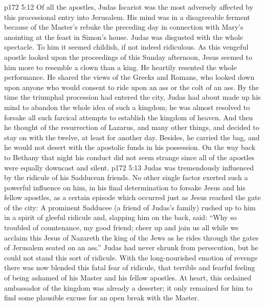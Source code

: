 \vs p172 5:12 Of all the apostles, Judas Iscariot was the most adversely affected by this processional entry into Jerusalem. His mind was in a disagreeable ferment because of the Master’s rebuke the preceding day in connection with Mary’s anointing at the feast in Simon’s house. Judas was disgusted with the whole spectacle. To him it seemed childish, if not indeed ridiculous. As this vengeful apostle looked upon the proceedings of this Sunday afternoon, Jesus seemed to him more to resemble a clown than a king. He heartily resented the whole performance. He shared the views of the Greeks and Romans, who looked down upon anyone who would consent to ride upon an ass or the colt of an ass. By the time the triumphal procession had entered the city, Judas had about made up his mind to abandon the whole idea of such a kingdom; he was almost resolved to forsake all such farcical attempts to establish the kingdom of heaven. And then he thought of the resurrection of Lazarus, and many other things, and decided to stay on with the twelve, at least for another day. Besides, he carried the bag, and he would not desert with the apostolic funds in his possession. On the way back to Bethany that night his conduct did not seem strange since all of the apostles were equally downcast and silent.
\vs p172 5:13 Judas was tremendously influenced by the ridicule of his Sadducean friends. No other single factor exerted such a powerful influence on him, in his final determination to forsake Jesus and his fellow apostles, as a certain episode which occurred just as Jesus reached the gate of the city: A prominent Sadducee (a friend of Judas’s family) rushed up to him in a spirit of gleeful ridicule and, slapping him on the back, said: “Why so troubled of countenance, my good friend; cheer up and join us all while we acclaim this Jesus of Nazareth the king of the Jews as he rides through the gates of Jerusalem seated on an ass.” Judas had never shrunk from persecution, but he could not stand this sort of ridicule. With the long\hyp{}nourished emotion of revenge there was now blended this fatal fear of ridicule, that terrible and fearful feeling of being ashamed of his Master and his fellow apostles. At heart, this ordained ambassador of the kingdom was already a deserter; it only remained for him to find some plausible excuse for an open break with the Master.
\quizlink
